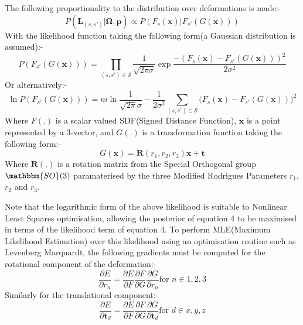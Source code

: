The following proportionality to the distribution over deformations is made:-
\begin{equation}
P(\mathbf{L}_{(s, s')} | \mathbf{\Omega}, \mathbf{p}) \propto P(F_{s}(\mathbf{x}) | F_{s'}(G(\mathbf{x})))
\end{equation}
With the likelihood function taking the following form(a Gaussian distribution is assumed):-
\begin{equation}
P(F_{s'}(G(\mathbf{x}))) = \prod_{(s, s') \in \mathcal{S}} \frac{1}{\sqrt{2 \pi \sigma}} \exp{\frac{-(F_{s}(\mathbf{x}) - F_{s'}(G(\mathbf{x})))^2}{2\sigma^2}}
\end{equation}
Or alternatively:-
\begin{equation}
\ln P(F_{s'}(G(\mathbf{x}))) = m\ln\frac{1}{\sqrt{2\pi}\sigma} -\frac{1}{2\sigma^2} \sum_{(s, s') \in \mathcal{S}} \bigg( F_{s}(\mathbf{x}) - F_{s'}(G(\mathbf{x})) \bigg)^2
\end{equation}
Where $F(.)$ is a scalar valued SDF(Signed Distance Function), $\mathbf{x}$ is a point represented by a 3-vector, and $G(.)$ is a transformation function taking
the following form:-
\begin{equation}
G(\mathbf{x}) = \mathbf{R}(r_{1}, r_{2}, r_{3})\mathbf{x} + \mathbf{t}
\end{equation}
Where $\mathbf{R}(.)$ is a rotation matrix from the Special Orthogonal group $\mathbbm{SO}(3)$ paramaterised by the three Modified 
Rodrigues Parameters\cite{Shuster1993} $r_{1}$, $r_{2}$ and $r_{3}$.

Note that the logarithmic form of the above likelihood is suitable to Nonlinear Least Squares optimisation, allowing the posterior of equation 4 
to be maximised in terms of the likelihood term of equation 4. To perform MLE(Maximum Likelihood Estimation) over this likelihood using 
an optimisation routine such as Levenberg Marquardt, the following gradients must be computed for the rotational component of the 
deformation:-
\begin{equation}
\frac{\partial E}{\partial r_{n}} = \frac{\partial E}{\partial F} \frac{\partial F}{\partial G} \frac{\partial G}{\partial r_{n}} \text{for } n \in {1,2,3}
\end{equation}
Similarly for the translational component:-
\begin{equation}
\frac{\partial E}{\partial \mathbf{t}_{d}} = \frac{\partial E}{\partial F} \frac{\partial F}{\partial G} \frac{\partial G}{\partial \mathbf{t}_{d}} \text{for } d \in {x,y,z}
\end{equation}

